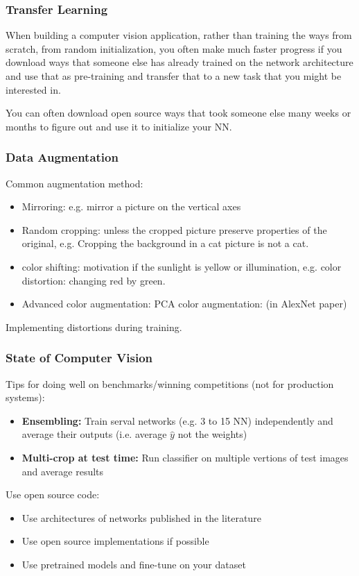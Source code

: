 \subsubsection{Transfer Learning}
When building a computer vision application, rather than training the ways from scratch, from random initialization, you often make much faster progress if you download ways that someone else has already trained on the network architecture and use that as pre-training and transfer that to a new task that you might be interested in.

You can often download open source ways that took someone else many weeks or months to figure out and use it to initialize your NN.

\subsubsection{Data Augmentation}
Common augmentation method:
\begin{itemize}
    \item Mirroring: e.g. mirror a picture on the vertical axes
    \item Random cropping: unless the cropped picture preserve properties of the original, e.g. Cropping the background in a cat picture is not a cat.
    \item color shifting: motivation if the sunlight is yellow or illumination, e.g. color distortion: changing red by green.
    \item Advanced color augmentation: PCA color augmentation: (in AlexNet paper)
\end{itemize}
Implementing distortions during training.

\subsubsection{State of Computer Vision}
Tips for doing well on benchmarks/winning competitions (not for production systems):
\begin{itemize}
    \item \textbf{Ensembling:} Train serval networks (e.g. 3 to 15 NN) independently and average their outputs (i.e. average $\hat{y}$ not the weights)
    \item \textbf{Multi-crop at test time:} Run classifier on multiple vertions of test images and average results
\end{itemize}
Use open source code:
\begin{itemize}
    \item Use architectures of networks published in the literature
    \item Use open source implementations if possible
    \item Use pretrained models and fine-tune on your dataset
\end{itemize}

